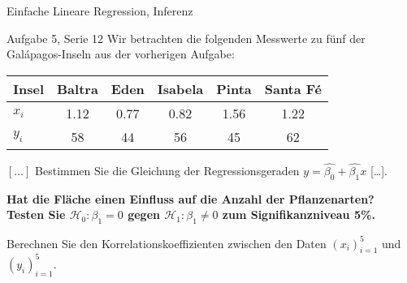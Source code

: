 \documentclass{beamer}
\begin{document}
\begin{frame}{Einfache Lineare Regression, Inferenz}
\begin{beamerboxesrounded}[shadow]{Aufgabe 5, Serie 12}
Wir betrachten die folgenden Messwerte zu fünf der Galápagos-Inseln aus der
vorherigen Aufgabe:

\begin{center}{\scriptsize\begin{tabular}{l|ccccc}\toprule
Insel & Baltra & Eden & Isabela & Pinta & Santa Fé\\\midrule
$x_i$&
 1.12 & 0.77 & 0.82 & 1.56 & 1.22\\
$y_i$&
  58 & 44 & 56 & 45 & 62\\
\bottomrule
\end{tabular}}\end{center}

\begin{outline}
\item $[\dots]$ Bestimmen Sie die Gleichung der Regressionsgeraden
$y=\hat{\beta_0}+\hat{\beta_1}x$ [\dots].
\item \textbf{Hat die Fläche einen Einfluss auf die Anzahl der Pflanzenarten?
Testen Sie $\mathcal{H}_0: \beta_1 = 0$ gegen $\mathcal{H}_1: \beta_1 \ne 0$
zum Signifikanzniveau 5\%.}
\item Berechnen Sie den Korrelationskoeffizienten zwischen den Daten
$(x_i)_{i=1}^5$ und $(y_i)_{i=1}^5$.
\end{outline}
\end{beamerboxesrounded}
\end{frame}

%
%
\end{document}
